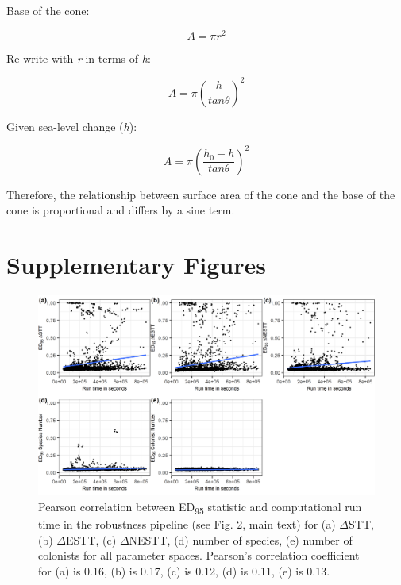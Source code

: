 Base of the cone: 

\[ A = \pi r^2 \]

Re-write with \textit{r} in terms of \textit{h}:

\[ A = \pi \left( \frac{h}{tan \theta} \right)^2 \]

Given sea-level change (\textit{h}): 

\[ A = \pi \left( \frac{h_0 - h}{tan \theta} \right) ^2 \]

Therefore, the relationship between surface area of the cone and the base of the cone is proportional and differs by a sine term.

\clearpage

\section*{Supplementary Figures}

\begin{figure}[h]
    \centering
    \includegraphics{runtime_ed95_corr.png}
    \caption{Pearson correlation between ED\textsubscript{95} statistic and computational run time in the robustness pipeline (see Fig. 2, main text) for (a) $\Delta$STT, (b) $\Delta$ESTT, (c) $\Delta$NESTT, (d) number of species, (e) number of colonists for all parameter spaces. Pearson’s correlation coefficient for (a) is 0.16, (b) is 0.17, (c) is 0.12, (d) is 0.11, (e) is 0.13.}
    \label{fig:runtime_ed95_corr}
\end{figure}

